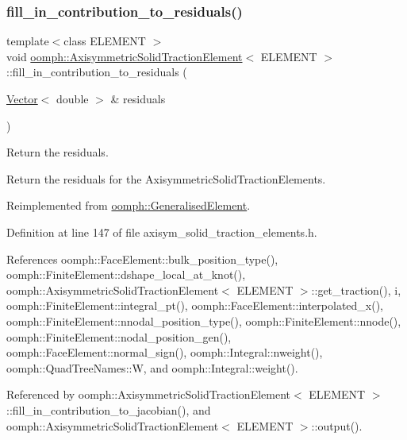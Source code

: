 \subsubsection{\texorpdfstring{fill\+\_\+in\+\_\+contribution\+\_\+to\+\_\+residuals()}{fill\_in\_contribution\_to\_residuals()}}
{\footnotesize\ttfamily template$<$class E\+L\+E\+M\+E\+NT $>$ \\
void \hyperlink{classoomph_1_1AxisymmetricSolidTractionElement}{oomph\+::\+Axisymmetric\+Solid\+Traction\+Element}$<$ E\+L\+E\+M\+E\+NT $>$\+::fill\+\_\+in\+\_\+contribution\+\_\+to\+\_\+residuals (\begin{DoxyParamCaption}\item[{\hyperlink{classoomph_1_1Vector}{Vector}$<$ double $>$ \&}]{residuals }\end{DoxyParamCaption})\hspace{0.3cm}{\ttfamily [virtual]}}



Return the residuals. 

Return the residuals for the Axisymmetric\+Solid\+Traction\+Elements. 

Reimplemented from \hyperlink{classoomph_1_1GeneralisedElement_a310c97f515e8504a48179c0e72c550d7}{oomph\+::\+Generalised\+Element}.



Definition at line 147 of file axisym\+\_\+solid\+\_\+traction\+\_\+elements.\+h.



References oomph\+::\+Face\+Element\+::bulk\+\_\+position\+\_\+type(), oomph\+::\+Finite\+Element\+::dshape\+\_\+local\+\_\+at\+\_\+knot(), oomph\+::\+Axisymmetric\+Solid\+Traction\+Element$<$ E\+L\+E\+M\+E\+N\+T $>$\+::get\+\_\+traction(), i, oomph\+::\+Finite\+Element\+::integral\+\_\+pt(), oomph\+::\+Face\+Element\+::interpolated\+\_\+x(), oomph\+::\+Finite\+Element\+::nnodal\+\_\+position\+\_\+type(), oomph\+::\+Finite\+Element\+::nnode(), oomph\+::\+Finite\+Element\+::nodal\+\_\+position\+\_\+gen(), oomph\+::\+Face\+Element\+::normal\+\_\+sign(), oomph\+::\+Integral\+::nweight(), oomph\+::\+Quad\+Tree\+Names\+::W, and oomph\+::\+Integral\+::weight().



Referenced by oomph\+::\+Axisymmetric\+Solid\+Traction\+Element$<$ E\+L\+E\+M\+E\+N\+T $>$\+::fill\+\_\+in\+\_\+contribution\+\_\+to\+\_\+jacobian(), and oomph\+::\+Axisymmetric\+Solid\+Traction\+Element$<$ E\+L\+E\+M\+E\+N\+T $>$\+::output().

\mbox{\label{classoomph_1_1AxisymmetricSolidTractionElement_a1386f6f1d58c17fc9357f01ddaf38742}} 
